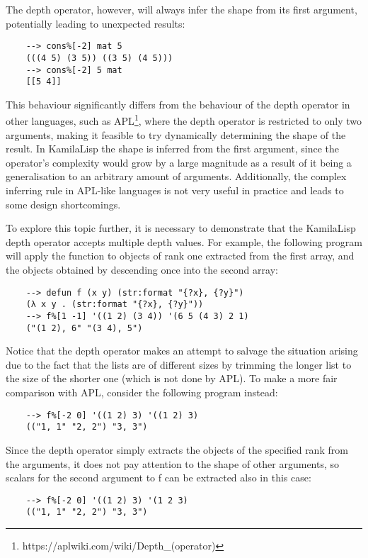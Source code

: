 The depth operator, however, will always infer the shape from its first argument, potentially leading to unexpected results:

\begin{Verbatim}
    --> cons%[-2] mat 5
    (((4 5) (3 5)) ((3 5) (4 5)))
    --> cons%[-2] 5 mat
    [[5 4]]
\end{Verbatim}

This behaviour significantly differs from the behaviour of the depth operator in other languages, such as APL\footnote{https://aplwiki.com/wiki/Depth\_(operator)}, where the depth operator is restricted to only two arguments, making it feasible to try dynamically determining the shape of the result. In KamilaLisp the shape is inferred from the first argument, since the operator's complexity would grow by a large magnitude as a result of it being a generalisation to an arbitrary amount of arguments. Additionally, the complex inferring rule in APL-like languages is not very useful in practice and leads to some design shortcomings.

To explore this topic further, it is necessary to demonstrate that the KamilaLisp depth operator accepts multiple depth values. For example, the following program will apply the function to objects of rank one extracted from the first array, and the objects obtained by descending once into the second array:

\begin{Verbatim}
    --> defun f (x y) (str:format "{?x}, {?y}")
    (λ x y . (str:format "{?x}, {?y}"))
    --> f%[1 -1] '((1 2) (3 4)) '(6 5 (4 3) 2 1)
    ("(1 2), 6" "(3 4), 5")
\end{Verbatim}

Notice that the depth operator makes an attempt to salvage the situation arising due to the fact that the lists are of different sizes by trimming the longer list to the size of the shorter one (which is not done by APL). To make a more fair comparison with APL, consider the following program instead:

\begin{Verbatim}
    --> f%[-2 0] '((1 2) 3) '((1 2) 3)
    (("1, 1" "2, 2") "3, 3")
\end{Verbatim}

Since the depth operator simply extracts the objects of the specified rank from the arguments, it does not pay attention to the shape of other arguments, so scalars for the second argument to f can be extracted also in this case:

\begin{Verbatim}
    --> f%[-2 0] '((1 2) 3) '(1 2 3)
    (("1, 1" "2, 2") "3, 3")
\end{Verbatim}

